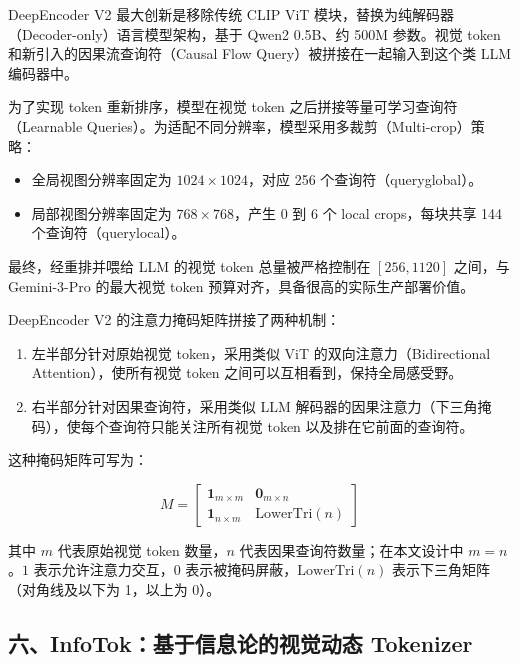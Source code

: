 DeepEncoder V2 最大创新是移除传统 CLIP ViT 模块，替换为纯解码器（Decoder-only）语言模型架构，基于 Qwen2 0.5B、约 500M 参数。视觉 token 和新引入的因果流查询符（Causal Flow Query）被拼接在一起输入到这个类 LLM 编码器中。

为了实现 token 重新排序，模型在视觉 token 之后拼接等量可学习查询符（Learnable Queries）。为适配不同分辨率，模型采用多裁剪（Multi-crop）策略：

\begin{itemize}
\tightlist
\item
  全局视图分辨率固定为 \(1024\times1024\)，对应 256 个查询符（queryglobal）。
\item
  局部视图分辨率固定为 \(768\times768\)，产生 0 到 6 个 local crops，每块共享 144 个查询符（querylocal）。
\end{itemize}

最终，经重排并喂给 LLM 的视觉 token 总量被严格控制在 \([256,1120]\) 之间，与 Gemini-3-Pro 的最大视觉 token 预算对齐，具备很高的实际生产部署价值。

DeepEncoder V2 的注意力掩码矩阵拼接了两种机制：

\begin{enumerate}
\def\labelenumi{\arabic{enumi}.}
\tightlist
\item
  左半部分针对原始视觉 token，采用类似 ViT 的双向注意力（Bidirectional Attention），使所有视觉 token 之间可以互相看到，保持全局感受野。
\item
  右半部分针对因果查询符，采用类似 LLM 解码器的因果注意力（下三角掩码），使每个查询符只能关注所有视觉 token 以及排在它前面的查询符。
\end{enumerate}

这种掩码矩阵可写为：

\[
M=
\begin{bmatrix}
\mathbf{1}_{m\times m} & \mathbf{0}_{m\times n} \\
\mathbf{1}_{n\times m} & \mathrm{LowerTri}(n)
\end{bmatrix}
\]

其中 \(m\) 代表原始视觉 token 数量，\(n\) 代表因果查询符数量；在本文设计中 \(m=n\)。\(1\) 表示允许注意力交互，\(0\) 表示被掩码屏蔽，\(\mathrm{LowerTri}(n)\) 表示下三角矩阵（对角线及以下为 1，以上为 0）。

\hypertarget{ux516dinfotokux57faux4e8eux4fe1ux606fux8bbaux7684ux89c6ux89c9ux52a8ux6001-tokenizer}{%
\subsection{六、InfoTok：基于信息论的视觉动态 Tokenizer}\label{ux516dinfotokux57faux4e8eux4fe1ux606fux8bbaux7684ux89c6ux89c9ux52a8ux6001-tokenizer}}

